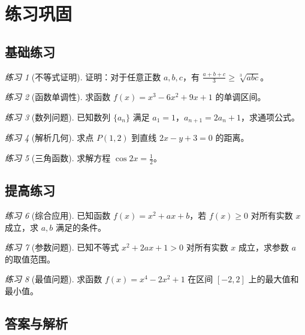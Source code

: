 \documentclass[a4paper,11pt]{ctexart}
\theoremstyle{definition}
\theoremstyle{remark}
\newtheorem{exercise}{练习}[section]
\begin{document}
\newpage

\section{练习巩固}

\subsection{基础练习}

\begin{exercise}[不等式证明]
证明：对于任意正数 $a, b, c$，有 $\frac{a+b+c}{3} \geq \sqrt[3]{abc}$。
\end{exercise}

\begin{exercise}[函数单调性]
求函数 $f(x) = x^3 - 6x^2 + 9x + 1$ 的单调区间。
\end{exercise}

\begin{exercise}[数列问题]
已知数列 $\{a_n\}$ 满足 $a_1 = 1$，$a_{n+1} = 2a_n + 1$，求通项公式。
\end{exercise}

\begin{exercise}[解析几何]
求点 $P(1, 2)$ 到直线 $2x - y + 3 = 0$ 的距离。
\end{exercise}

\begin{exercise}[三角函数]
求解方程 $\cos 2x = \frac{1}{2}$。
\end{exercise}

\subsection{提高练习}

\begin{exercise}[综合应用]
已知函数 $f(x) = x^2 + ax + b$，若 $f(x) \geq 0$ 对所有实数 $x$ 成立，求 $a, b$ 满足的条件。
\end{exercise}

\begin{exercise}[参数问题]
已知不等式 $x^2 + 2ax + 1 > 0$ 对所有实数 $x$ 成立，求参数 $a$ 的取值范围。
\end{exercise}

\begin{exercise}[最值问题]
求函数 $f(x) = x^4 - 2x^2 + 1$ 在区间 $[-2, 2]$ 上的最大值和最小值。
\end{exercise}

\subsection{答案与解析}
\end{document}
